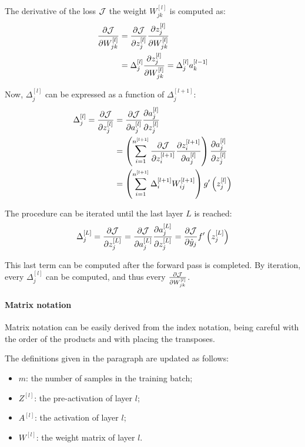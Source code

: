 The derivative of the loss $\mathcal{J}$ \wrt the weight $W_{jk}^{[l]}$ is computed as:
\begin{align*}
    \pdv{\mathcal{J}}{W_{jk}^{[l]}} &= \pdv{\mathcal{J}}{z_j^{[l]}} \pdv{z_j^{[l]}}{W_{jk}^{[l]}}\\
    &= \Delta_j^{[l]} \pdv{z_j^{[l]}}{W_{jk}^{[l]}} = \Delta_j^{[l]} a_k^{[l-1]}
\end{align*}

Now, $\Delta_j^{[l]}$ can be expressed as a function of $\Delta_j^{[l + 1]}$:
\begin{align*}
    \Delta_j^{[l]} = \pdv{\mathcal{J}}{z_j^{[l]}} &= \pdv{\mathcal{J}}{a_j^{[l]}} \pdv{a_j^{[l]}}{z_j^{[l]}}\\
    &= \left( \sum_{i=1}^{n^{[l + 1]}} \pdv{\mathcal{J}}{z_i^{[l+1]}} \pdv{z_i^{[l+1]}}{a_j^{[l]}} \right) \pdv{a_j^{[l]}}{z_j^{[l]}}\\
    &= \left( \sum_{i=1}^{n^{[l + 1]}} \Delta_i^{[l+1]} W_{ij}^{[l+1]} \right) g'\left(z_j^{[l]}\right)
\end{align*}

The procedure can be iterated until the last layer $L$ is reached:
\begin{align*}
    \Delta_j^{[L]} = \pdv{\mathcal{J}}{z_j^{[L]}} = \pdv{\mathcal{J}}{a_j^{[L]}} \pdv{a_j^{[L]}}{z_j^{[L]}} = \pdv{\mathcal{J}}{\hat{y}_j} f'\left(z_j^{[L]}\right)
\end{align*}

This last term can be computed after the forward pass is completed. By iteration, every $\Delta_j^{[l]}$ can be computed, and thus every $\pdv{\mathcal{J}}{W_{jk}^{[l]}}$.

\paragraph{Matrix notation} Matrix notation can be easily derived from the index notation, being careful with the order of the products and with placing the transposes.

The definitions given in the  paragraph are updated as follows:
\begin{itemize}
    \item $m$: the number of samples in the training batch;
    \item $Z^{[l]}$: the  pre-activation of layer $l$;
    \item $A^{[l]}$: the  activation of layer $l$;
    \item $W^{[l]}$: the  weight matrix of layer $l$.
\end{itemize}

